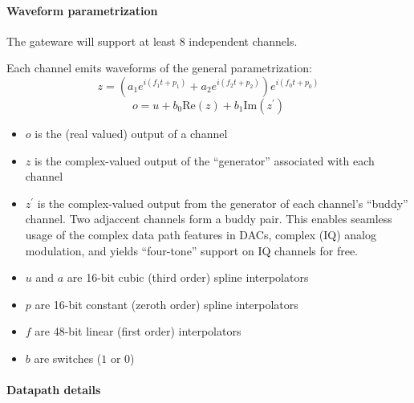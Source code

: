 \documentclass[11pt]{paper}
\begin{document}
\paragraph{Waveform parametrization}

The gateware will support at least 8 independent channels.

Each channel emits waveforms of the general parametrization:
$$
	z=\left( a_1e^{i(f_1 t+p_1)} + a_2e^{i(f_2 t+p_2)}\right)e^{i(f_0t+p_0)}
$$
$$
	o=u+b_0\mathrm{Re}(z)+b_1\mathrm{Im}(z^\prime)
$$

\begin{itemize}
	\item $o$ is the (real valued) output of a channel
	\item $z$ is the complex-valued output of the ``generator'' associated with each channel
	\item $z^\prime$ is the complex-valued output from the generator of each channel's ``buddy'' channel.
		Two adjaccent channels form a buddy pair.
		This enables seamless usage of the complex data path features in DACs, complex (IQ) analog modulation, and yields ``four-tone'' support on IQ channels for free.
	\item $u$ and $a$ are 16-bit cubic (third order) spline interpolators
	\item $p$ are 16-bit constant (zeroth order) spline interpolators
	\item $f$ are 48-bit linear (first order) interpolators
	\item $b$ are switches ($1$ or $0$)
\end{itemize}

\paragraph{Datapath details}
\end{document}
